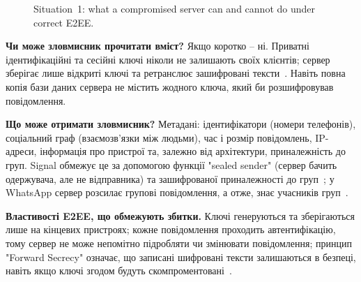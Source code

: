 \begin{figure}[H]
    \centering
    \caption{Situation~1: what a compromised server can and cannot do under correct E2EE.}
    \label{fig:s1}
\end{figure}

\textbf{Чи може зловмисник прочитати вміст?} Якщо коротко -- ні. Приватні ідентифікаційні та сесійні ключі ніколи 
не залишають своїх клієнтів; сервер зберігає лише відкриті ключі та ретранслює зашифровані тексти~\cite{whatsapp_whitepaper, signal_x3dh}. 
Навіть повна копія бази даних сервера не містить жодного ключа, який би розшифровував повідомлення.

\textbf{Що може отримати зловмисник?} Метадані: ідентифікатори (номери телефонів), соціальний граф 
(взаємозв'язки між людьми), час і розмір повідомлень, IP-адреси, інформація про пристрої та, залежно від архітектури, 
приналежність до груп. Signal обмежує це за допомогою функції "sealed sender" (сервер бачить одержувача, але не 
відправника) та зашифрованої приналежності до груп~\cite{signal_sealed_sender, signal_private_groups}; у WhatsApp 
сервер розсилає групові повідомлення, а отже, знає учасників груп~\cite{whatsapp_whitepaper}.

\textbf{Властивості E2EE, що обмежують збитки.} Ключі генеруються та зберігаються лише на кінцевих пристроях; кожне 
повідомлення проходить автентифікацію, тому сервер не може непомітно підробляти чи змінювати повідомлення; принцип 
"Forward Secrecy"{} означає, що записані шифровані тексти залишаються в безпеці, навіть якщо ключі згодом 
будуть скомпроментовані~\cite{signal_double_ratchet}.

